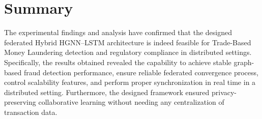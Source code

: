 

\section[Summary]
{\textbf{Summary}}

The experimental findings and analysis have confirmed that the designed federated Hybrid HGNN–LSTM architecture is indeed feasible for Trade-Based Money Laundering detection and regulatory compliance in distributed settings. Specifically, the results obtained revealed the capability to achieve stable graph-based fraud detection performance, ensure reliable federated convergence process, control scalability features, and perform proper synchronization in real time in a distributed setting. Furthermore, the designed framework ensured privacy-preserving collaborative learning without needing any centralization of transaction data.
